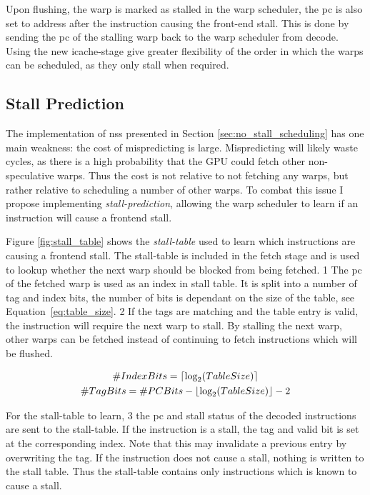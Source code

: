 Upon flushing, the warp is marked as stalled in the warp scheduler, the \acrshort{pc} is also set to address after the instruction causing the front-end stall. This is done by sending the \acrshort{pc} of the stalling warp back to the warp scheduler from decode. Using the new icache-stage give greater flexibility of the order in which the warps can be scheduled, as they only stall when required. 

\subsection{Stall Prediction}

The implementation of \acrshort{nss} presented in Section \ref{sec:no_stall_scheduling} has one main weakness: the cost of mispredicting is large. Mispredicting will likely waste cycles, as there is a high probability that the GPU could fetch other non-speculative warps. Thus the cost is not relative to not fetching any warps, but rather relative to scheduling a number of other warps. To combat this issue I propose implementing \textit{stall-prediction}, allowing the warp scheduler to learn if an instruction will cause a frontend stall.

Figure \ref{fig:stall_table} shows the \textit{stall-table} used to learn which instructions are causing a frontend stall. The stall-table is included in the fetch stage and is used to lookup whether the next warp should be blocked from being fetched. \textcircled{\small{1}} The \acrshort{pc} of the fetched warp is used as an index in stall table. It is split into a number of tag and index bits, the number of bits is dependant on the size of the table, see Equation~\ref{eq:table_size}. \textcircled{\small{2}} If the tags are matching and the table entry is valid, the instruction will require the next warp to stall. By stalling the next warp, other warps can be fetched instead of continuing to fetch instructions which will be flushed.

\begin{equation} \label{eq:table_size}
\begin{gathered}
    \#IndexBits = \ceil*{\text{log}_2(TableSize)} \\
    \#TagBits = \#PCBits - \floor*{\text{log}_2(TableSize)} - 2
\end{gathered}
\end{equation}

For the stall-table to learn, \textcircled{\small{3}} the \acrshort{pc} and stall status of the decoded instructions are sent to the stall-table. If the instruction is a stall, the tag and valid bit is set at the corresponding index. Note that this may invalidate a previous entry by overwriting the tag. If the instruction does not cause a stall, nothing is written to the stall table. Thus the stall-table contains only instructions which is known to cause a stall.

